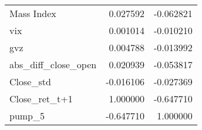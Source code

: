 \begin{tabular}{lrr}
Mass Index               &       0.027592 & -0.062821 \\
vix                      &       0.001014 & -0.010210 \\
gvz                      &       0.004788 & -0.013992 \\
abs\_diff\_close\_open      &       0.020939 & -0.053817 \\
Close\_std                &      -0.016106 & -0.027369 \\
Close\_ret\_t+1            &       1.000000 & -0.647710 \\
pump\_5                   &      -0.647710 &  1.000000 \\
\bottomrule
\end{tabular}
